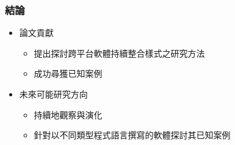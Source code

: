 \documentclass[utf8x]{beamer}
\begin{document}



\begin{frame}%
\frametitle{結論}%
\begin{itemize}
\setlength{\itemindent}{1em}
\item[] 論文貢獻
\begin{itemize}
\item 提出探討跨平台軟體持續整合樣式之研究方法
\item 成功尋獲已知案例
\end{itemize}
\item[] 未來可能研究方向
\begin{itemize}
\item 持續地觀察與演化
\item 針對以不同類型程式語言撰寫的軟體探討其已知案例
\end{itemize}
\end{itemize}
\end{frame}

\end{document}
